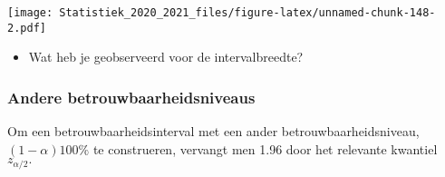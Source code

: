 \documentclass[
  12pt,dutch,coursenotes]{book}
\newenvironment{Shaded}{\begin{snugshade}}{\end{snugshade}}
\newcommand{\DataTypeTok}[1]{\textcolor[rgb]{0.13,0.29,0.53}{#1}}
\newcommand{\DecValTok}[1]{\textcolor[rgb]{0.00,0.00,0.81}{#1}}
\newcommand{\FloatTok}[1]{\textcolor[rgb]{0.00,0.00,0.81}{#1}}
\newcommand{\KeywordTok}[1]{\textcolor[rgb]{0.13,0.29,0.53}{\textbf{#1}}}
\newcommand{\NormalTok}[1]{#1}
\newcommand{\OperatorTok}[1]{\textcolor[rgb]{0.81,0.36,0.00}{\textbf{#1}}}
\newcommand{\StringTok}[1]{\textcolor[rgb]{0.31,0.60,0.02}{#1}}
\providecommand{\tightlist}{%
  \setlength{\itemsep}{0pt}\setlength{\parskip}{0pt}}
\theoremstyle{definition}
\theoremstyle{definition}
\theoremstyle{definition}
\theoremstyle{remark}
\begin{document}
\begin{Shaded}
\end{Shaded}

\texttt{[image: Statistiek\_2020\_2021\_files/figure-latex/unnamed-chunk-148-2.pdf]}

\begin{itemize}
\tightlist
\item
  Wat heb je geobserveerd voor de intervalbreedte?
\end{itemize}

\hypertarget{andere-betrouwbaarheidsniveaus}{%
\subsubsection{Andere betrouwbaarheidsniveaus}\label{andere-betrouwbaarheidsniveaus}}

Om een betrouwbaarheidsinterval met een ander betrouwbaarheidsniveau, \((1- \alpha)100\%\) te construeren, vervangt men 1.96 door het relevante kwantiel \(z_{\alpha/2}.\)
\end{document}
